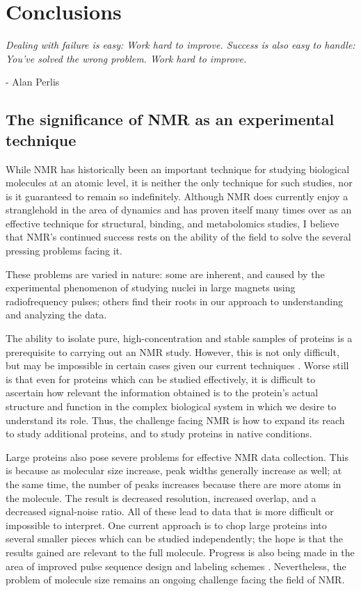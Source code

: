 \chapter{Conclusions}

\begin{center}
  \textit{Dealing with failure is easy: Work hard to improve. Success is also 
    easy to handle: You've solved the wrong problem. Work hard to improve.}

 - Alan Perlis
\end{center}


\section{The significance of NMR as an experimental technique}
While NMR has historically been an important technique for studying biological
molecules at an atomic level, it is neither the only technique for such 
studies, nor is it guaranteed to remain so indefinitely.  Although NMR does
currently enjoy a stranglehold in the area of dynamics and has proven itself
many times over as an effective technique for structural, binding, and metabolomics
studies, I believe that NMR's continued success rests on the ability of the
field to solve the several pressing problems facing it.

These problems are varied in nature: some are inherent, and caused by the 
experimental phenomenon of studying nuclei in large magnets using 
radiofrequency pulses; others find their roots in our approach to 
understanding and analyzing the data.

The ability to isolate pure, high-concentration and stable samples of proteins 
is a prerequisite to carrying out an NMR study.  However, this is not only
difficult, but may be impossible in certain cases given our current techniques
\cite{bellstedt2013resonance}.  Worse still is that even for proteins which
can be studied effectively, it is difficult to ascertain how relevant the 
information obtained is to the protein's actual structure and function in the
complex biological system in which we desire to understand its role.  Thus, 
the challenge facing NMR is how to expand its reach to study additional proteins,
and to study proteins in native conditions.

Large proteins also pose severe problems for effective NMR data collection.  
This is because as molecular size increase, peak widths generally increase as
well; at the same time, the number of peaks increases because there are more
atoms in the molecule.  The result is decreased resolution, increased overlap,
and a decreased signal-noise ratio.  All of these lead to data that is more
difficult or impossible to interpret.  One current approach is to chop large
proteins into several smaller pieces which can be studied independently; the
hope is that the results gained are relevant to the full molecule.  
Progress is also being made in the area of improved pulse sequence design
and labeling schemes \cite{tzeng2012nmr}.  Nevertheless, the problem of molecule
size remains an ongoing challenge facing the field of NMR.

